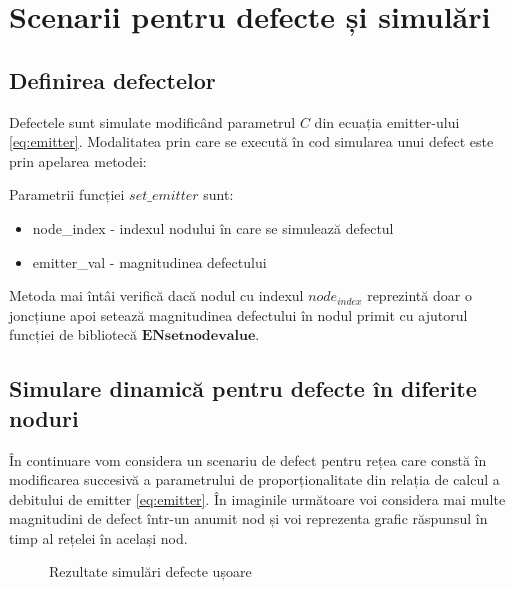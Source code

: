 \chapter{Scenarii pentru defecte și simulări}
\label{chap:detectie}
\section{Definirea defectelor}
Defectele sunt simulate modificând parametrul $C$ din ecuația emitter-ului \eqref{eq:emitter}. Modalitatea prin care se execută în cod simularea unui defect este prin apelarea metodei:



Parametrii funcției $set\_emitter$ sunt:
\begin{itemize}
\item node\_index - indexul nodului în care se simulează defectul
\item emitter\_val - magnitudinea defectului
\end{itemize}

Metoda mai întâi verifică dacă nodul cu indexul $node_{index}$ reprezintă doar o joncțiune apoi setează magnitudinea defectului în nodul primit cu ajutorul funcției de bibliotecă $\mathbf{ENsetnodevalue}$.

\section{Simulare dinamică pentru defecte în diferite noduri}

În continuare vom considera un scenariu de defect pentru rețea care constă în modificarea succesivă a parametrului de proporționalitate din relația de calcul a debitului de emitter \eqref{eq:emitter}. În imaginile următoare voi considera mai multe magnitudini de defect într-un anumit nod și voi reprezenta grafic răspunsul în timp al rețelei în același nod.

\begin{figure}[H]

\qquad
{}

\caption{Rezultate simulări defecte ușoare}
\label{fig:ref_emitter_soft}
\end{figure}

